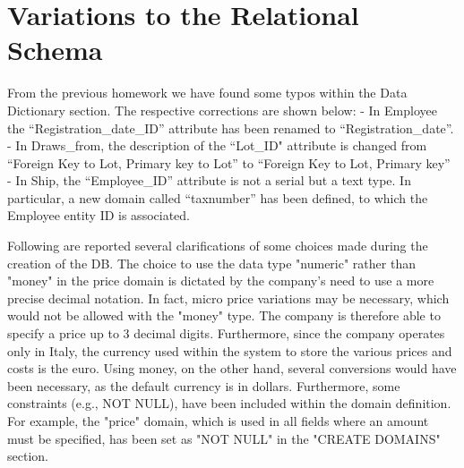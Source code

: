 \section{Variations to the Relational Schema}

From the previous homework we have found some typos within the Data Dictionary section. The respective corrections are shown below:
- In Employee the ``Registration\_date\_ID'' attribute has been renamed to ``Registration\_date''.
- In Draws\_from, the description of the ``Lot\_ID" attribute is changed from ``Foreign Key to Lot, Primary key to Lot'' to ``Foreign Key to Lot, Primary key''
- In Ship, the ``Employee\_ID'' attribute is not a serial but a text type. In particular, a new domain called ``taxnumber'' has been defined, to which the Employee entity ID is associated.

Following are reported several clarifications of some choices made during the creation of the DB. The choice to use the data type "numeric" rather than "money" in the price domain is dictated by the company's need to use a more precise decimal notation. In fact, micro price variations may be necessary, which would not be allowed with the "money" type. The company is therefore able to specify a price up to 3 decimal digits. Furthermore, since the company operates only in Italy, the currency used within the system to store the various prices and costs is the euro. Using money, on the other hand, several conversions would have been necessary, as the default currency is in dollars. Furthermore, some constraints (e.g., NOT NULL), have been included within the domain definition. For example, the "price" domain, which is used in all fields where an amount must be specified, has been set as "NOT NULL" in the "CREATE DOMAINS" section.
